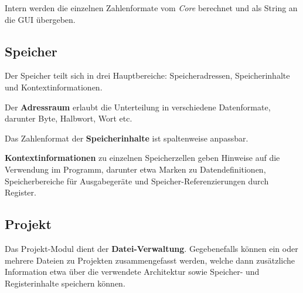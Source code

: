             Intern werden die einzelnen Zahlenformate vom \textit{Core} berechnet und als String an die GUI übergeben.

        \subsection{Speicher}

            Der Speicher teilt sich in drei Hauptbereiche: Speicheradressen, Speicherinhalte und Kontextinformationen.

            Der \textbf{Adressraum} erlaubt die Unterteilung in verschiedene Datenformate, darunter Byte, Halbwort, Wort etc.

            Das Zahlenformat der \textbf{Speicherinhalte} ist spaltenweise anpassbar.

            \textbf{Kontextinformationen} zu einzelnen Speicherzellen geben Hinweise auf die Verwendung im Programm, darunter etwa Marken zu Datendefinitionen, Speicherbereiche für Ausgabegeräte und Speicher-Referenzierungen durch Register.

        \subsection{Projekt}

            Das Projekt-Modul dient der \textbf{Datei-Verwaltung}. Gegebenefalls können ein oder mehrere Dateien zu Projekten zusammengefasst werden, welche dann zusätzliche Information etwa über die verwendete Architektur sowie Speicher- und Registerinhalte speichern können.